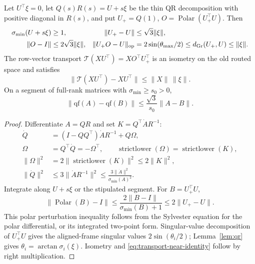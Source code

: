 \begin{lemma}
\label{lem:qr-frame}
Let $U^\top\xi=0$, let $Q(s)R(s)=U+s\xi$ be the thin QR decomposition
with positive diagonal in $R(s)$, and put $U_+=Q(1)$,
$O=\operatorname{Polar}(U_+^\top U)$. Then
\begin{align}
 \sigma_{\min}(U+s\xi)&\ge1, &\|U_+-U\|&\le\sqrt3\|\xi\|,\\
 \|O-I\|&\le2\sqrt3\|\xi\|, &
 \|U_+O-U\|_{\rm op}&=2\sin(\theta_{\max}/2)
                      \le d_{\rm Gr}(U_+,U)\le\|\xi\|.\label{eq:frame-bounds}
\end{align}
The row-vector transport $\mathcal T(XU^\top)=XO^\top U_+^\top$ is an
isometry on the old routed space and satisfies
\begin{equation}
 \|\mathcal T(XU^\top)-XU^\top\|\le\|X\|\,\|\xi\|.\label{eq:transport-near-identity}
\end{equation}
On a segment of full-rank matrices with $\sigma_{\min}\ge s_0>0$,
\begin{equation}
 \|\mathrm{qf}(A)-\mathrm{qf}(B)\|
       \le\frac{\sqrt3}{s_0}\|A-B\|.\label{eq:qr-explicit-lip}
\end{equation}
\end{lemma}
\begin{proof}
Differentiate $A=QR$ and set $K=Q^\top\dot A R^{-1}$:
\begin{align}
 \dot Q&=(I-QQ^\top)\dot A R^{-1}+Q\Omega,\\
 \Omega&=Q^\top\dot Q=-\Omega^\top,\qquad
 \operatorname{strictlower}(\Omega)=\operatorname{strictlower}(K),\\
 \|\Omega\|^2&=2\|\operatorname{strictlower}(K)\|^2\le2\|K\|^2,\\
 \|\dot Q\|^2
 &\le3\|\dot A R^{-1}\|^2
 \le\frac{3\|\dot A\|^2}{\sigma_{\min}(A)^2}.
\end{align}
Integrate along $U+s\xi$ or the stipulated segment. For $B=U_+^\top U$,
\begin{equation}
 \|\operatorname{Polar}(B)-I\|
 \le\frac{2\|B-I\|}{\sigma_{\min}(B)+1}
 \le2\|U_+-U\|.
\end{equation}
This polar perturbation inequality follows from the Sylvester equation for
the polar differential, or its integrated two-point form. Singular-value
decomposition of $U_+^\top U$ gives the aligned-frame singular values
$2\sin(\theta_i/2)$; Lemma~\ref{lem:qr} gives
$\theta_i=\arctan\sigma_i(\xi)$. Isometry and
\eqref{eq:transport-near-identity} follow by right multiplication.
\end{proof}

